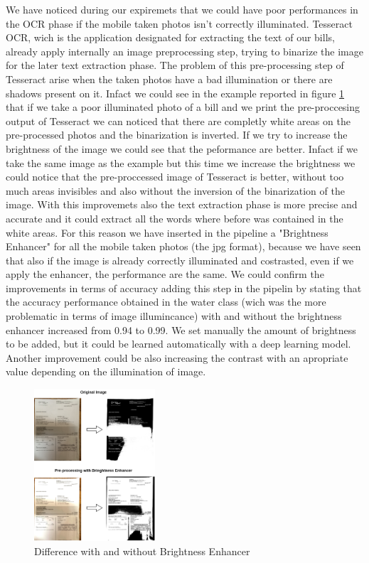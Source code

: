 \documentclass[10pt,twocolumn,letterpaper]{article}
\begin{document}
We have noticed during our expiremets that we could have poor
performances in the OCR phase if the mobile taken photos isn't
correctly illuminated. Tesseract OCR, wich is the application
designated for extracting the text of our bills, already apply
internally an image preprocessing step, trying to binarize the image
for the later text extraction phase. The problem of this
pre-processing step of Tesseract arise when the taken photos have a
bad illumination or there are shadows present on it. Infact we could
see in the example reported in figure
\ref{bright-constrast-experiment} that if we take a poor illuminated
photo of a bill and we print the pre-proccesing output of Tesseract we
can noticed that there are completly white areas on the pre-processed
photos and the binarization is inverted. If we try to increase the
brightness of the image we could see that the peformance are
better. Infact if we take the same image as the example but this time
we increase the brightness we could notice that the pre-proccessed
image of Tesseract is better, without too much areas invisibles and
also without the inversion of the binarization of the image. With this
improvemets also the text extraction phase is more precise and
accurate and it could extract all the words where before was contained
in the white areas. For this reason we have inserted in the pipeline a
"Brightness Enhancer" for all the mobile taken photos (the jpg
format), because we have seen that also if the image is already
correctly illuminated and costrasted, even if we apply the enhancer,
the performance are the same. We could confirm the improvements in
terms of accuracy adding this step in the pipelin by stating that the
accuracy performance obtained in the water class (wich was the more
problematic in terms of image illumincance) with and without the
brightness enhancer increased from 0.94 to 0.99. We set manually the
amount of brightness to be added, but it could be learned
automatically with a deep learning model. Another improvement could be
also increasing the contrast with an apropriate value depending on the
illumination of image.

\begin{figure}[h]
  \centering
  \includegraphics[width=0.4\textwidth]{images/bright-contrast-experiment.png}
  \caption{Difference with and without Brightness Enhancer}
  \label{bright-constrast-experiment}
\end{figure}
\end{document}
